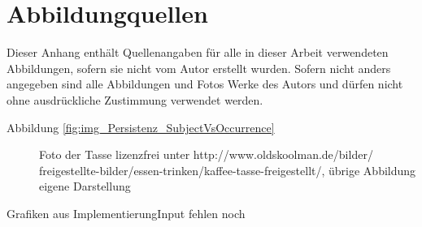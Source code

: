 \chapter*{Abbildungquellen}

Dieser Anhang enthält Quellenangaben für alle in dieser Arbeit verwendeten Abbildungen, sofern sie nicht vom Autor erstellt wurden. Sofern nicht anders angegeben sind alle Abbildungen und Fotos Werke des Autors und dürfen nicht ohne ausdrückliche Zustimmung verwendet werden.

\begin{description}
 \item[Abbildung \ref{fig:img_Persistenz_SubjectVsOccurrence}] Foto der Tasse lizenzfrei unter http://www.oldskoolman.de/bilder/\\freigestellte-bilder/essen-trinken/kaffee-tasse-freigestellt/, übrige Abbildung eigene Darstellung
 \end{description}

Grafiken aus ImplementierungInput fehlen noch